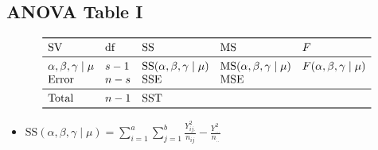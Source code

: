 \subsection*{ANOVA Table I}
\[ \begin{array}{lllll}
        \toprule
        \text{SV}                   & \text{df} & \text{SS}                              & \text{MS}                              & F                              \\
        \midrule
        \alpha,\beta,\gamma\mid \mu & s-1       & \text{SS}(\alpha,\beta,\gamma\mid \mu) & \text{MS}(\alpha,\beta,\gamma\mid \mu) & F(\alpha,\beta,\gamma\mid \mu) \\
        \text{Error}                & n-s       & \SSE                                   & \MSE                                                                    \\
        \midrule
        \text{Total}                & n-1       & \SST                                                                                                             \\
        \bottomrule
    \end{array} \]
\begin{itemize}
    \item $ \displaystyle \text{SS}(\alpha,\beta,\gamma\mid \mu) =\sum_{i=1}^{a}\sum_{j=1}^{b}\frac{Y_{ij.}^2}{n_{ij}}-\frac{Y_{...}^2}{n_{..}} $
\end{itemize}
